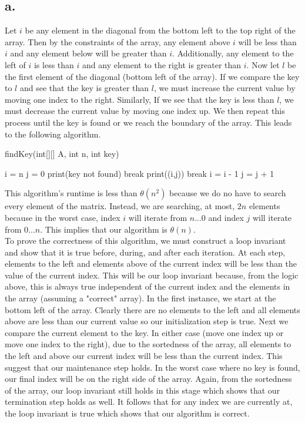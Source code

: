 \documentclass[12pt]{article}
\begin{document}
\subsection{a.}
Let $i$ be any element in the diagonal from the bottom left to the top right of the array. Then by the constraints of the array, any element above $i$ will be less than $i$ and any element below will be greater than $i$. Additionally, any element to the left of $i$ is less than $i$ and any element to the right is greater than $i$. Now let $l$ be the first element of the diagonal (bottom left of the array). If we compare the key to $l$ and see that the key is greater than $l$, we must increase the current value by moving one index to the right. Similarly, If we see that the key is less than $l$, we must decrease the current value by moving one index up. We then repeat this process until the key is found or we reach the boundary of the array. This leads to the following algorithm. \\


\begin{algorithm}
\caption{findKey(int[][] A, int n, int key)}
\begin{algorithmic} 
\STATE i = n
\STATE j = 0
\STATE print(key not found)
\STATE break
\ENDIF
{}
\STATE print((i,j))
\STATE break
\STATE i = i - 1
\ELSE
\STATE j = j + 1
\ENDIF
\ENDWHILE

\end{algorithmic}
\end{algorithm}


This algorithm's runtime is less than $\theta(n^2)$ because we do no have to search every element of the matrix. Instead, we are searching, at most, $2n$ elements because in the worst case, index $i$ will iterate from $n...0$ and index $j$ will iterate from $0...n$.  This implies that our algorithm is $\theta(n)$.\\
To prove the correctness of this algorithm, we must construct a loop invariant and show that it is true before, during, and after each iteration. At each step, elements to the left and elements above of the current index will be less than the value of the current index. This will be our loop invariant because, from the logic above, this is always true independent of the current index and the elements in the array (assuming a "correct" array). In the first instance, we start at the bottom left of the array. Clearly there are no elements to the left and all elements above are less than our current value so our initialization step is true. Next we compare the current element to the key. In either case (move one index up or move one index to the right), due to the sortedness of the array, all elements to the left and above our current index will be less than the current index. This suggest that our maintenance step holds. In the worst case where no key is found, our final index will be on the right side of the array. Again, from the sortedness of the array, our loop invariant still holds in this stage which shows that our termination step holds as well. It follows that for any index we are currently at, the loop invariant is true which shows that our algorithm is correct.
\end{document}
